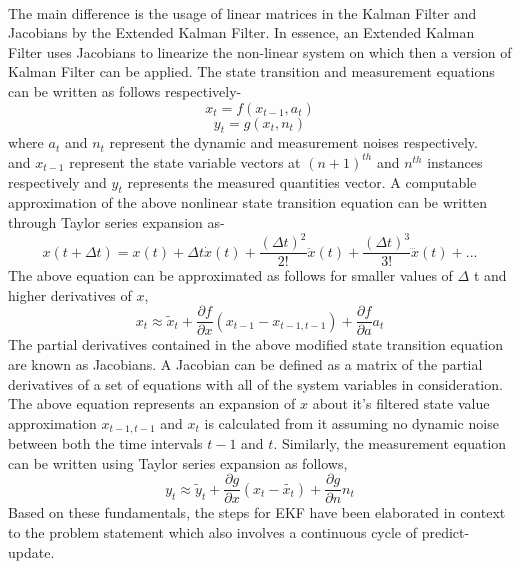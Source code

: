 \documentclass{article}
\begin{document}
\paragraph{}	The main difference is the usage of linear matrices in the Kalman Filter and Jacobians by the Extended Kalman Filter. In essence, an Extended Kalman Filter uses Jacobians to linearize the non-linear system on which then a version of Kalman Filter can be applied. The state transition and measurement equations can be written as follows respectively- \hfill  \\ \linebreak \begin{equation}
x_t = f(x_{t-1},a_t)
\label{state-transition-eq}
\end{equation}   
\begin{equation}  y_t = g(x_t,n_t) \label{measurement-eq} \end{equation}  
where {$a_t$} and {$n_t$} represent the dynamic and measurement noises respectively.\hfill  \\   and  {$x_{t-1}$} represent the state variable vectors at {$(n+1)^{th}$} and {$n^{th}$} instances respectively and {$y_t$} represents the measured quantities vector. A computable approximation of the above nonlinear  state transition equation can be written through Taylor series expansion as-\begin{equation}
x(t+\Delta t) = x(t) + \Delta t \dot{x}(t) +
\frac{(\Delta t)^2}{2!} \ddot{x}(t) +
\frac{(\Delta t)^3}{3!} \dddot{x}(t) + ...
\end{equation}
The above equation can be approximated as follows for smaller values of {$\Delta$} t and higher derivatives of $x$, 
\begin{equation}
x_t \approx \tilde{x}_t + \frac{\partial f}{\partial x}
(x_{t-1} - x_{t-1,t-1}) + \frac{\partial f}{\partial a} a_t
\label{state-transition-appx-eq}
\end{equation} 
The partial derivatives contained in the above modified state transition equation are known as Jacobians. A Jacobian can be defined as a matrix of the partial derivatives of a set of equations with all of the system variables in consideration.  The above equation represents an expansion of $x$ about it's filtered state value approximation $x_{t-1,t-1}$ and $x_t$ is calculated from it assuming no dynamic noise between both the time intervals $t-1$ and $t$.
Similarly, the measurement equation can be written using Taylor series expansion as follows, 
\begin{equation}
y_t \approx \tilde{y}_t + \frac{\partial g}{\partial x}
(x_t - \tilde{x_t}) + \frac{\partial g}{\partial n} n_t
\label{measurement-appx-eq}
\end{equation}
Based on these fundamentals, the steps for EKF have been elaborated in context to the problem statement which also involves a continuous cycle of predict-update.
\end{document}
